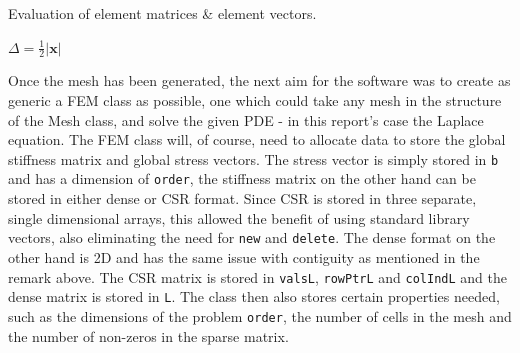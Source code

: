 \begin{algorithm}
	\caption{Evaluation of element matrices \& element vectors.}
	\label{algo:elems}
	
	$\Delta = \frac{1}{2}\vert \mathbf{x} \vert$\\
	
\end{algorithm}
Once the mesh has been generated, the next aim for the software was to create as generic a FEM class as possible, one which could take any mesh in the structure of the Mesh class, and solve the given PDE - in this report's case the Laplace equation. The FEM class will, of course, need to allocate data to store the global stiffness matrix and global stress vectors. The stress vector is simply stored in \texttt{b} and has a dimension of \texttt{order}, the stiffness matrix on the other hand can be stored in either dense or CSR format. Since CSR is stored in three separate, single dimensional arrays, this allowed the benefit of using standard library vectors, also eliminating the need for \texttt{new} and \texttt{delete}. The dense format on the other hand is 2D and has the same issue with contiguity as mentioned in the remark above. The CSR matrix is stored in \texttt{valsL}, \texttt{rowPtrL} and \texttt{colIndL} and the dense matrix is stored in \texttt{L}. The class then also stores certain properties needed, such as the dimensions of the problem \texttt{order}, the number of cells in the mesh and the number of non-zeros in the sparse matrix.


